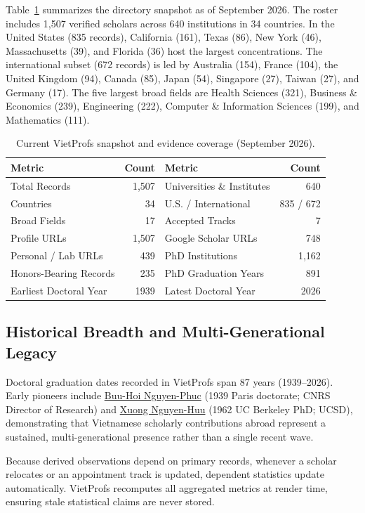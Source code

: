 \documentclass[11pt]{article}
\newcommand{\vplink}[2]{\href{https://vietprofs.roars.dev/?q=#1}{#2}}
\begin{document}
Table~\ref{tab:snapshot} summarizes the directory snapshot as of September 2026. The roster includes 1,507 verified scholars across 640 institutions in 34 countries. In the United States (835 records), California (161), Texas (86), New York (46), Massachusetts (39), and Florida (36) host the largest concentrations. The international subset (672 records) is led by Australia (154), France (104), the United Kingdom (94), Canada (85), Japan (54), Singapore (27), Taiwan (27), and Germany (17).
The five largest broad fields are Health Sciences (321), Business \& Economics (239), Engineering (222), Computer \& Information Sciences (199), and Mathematics (111).

\begin{table}[t]
\centering
\caption{Current VietProfs snapshot and evidence coverage (September 2026).}
\label{tab:snapshot}
\small
\begin{tabular}{lr@{\qquad}lr}
\toprule
Metric & Count & Metric & Count \\
\midrule
Total Records & 1,507 & Universities \& Institutes & 640 \\
Countries & 34 & U.S. / International & 835 / 672 \\
Broad Fields & 17 & Accepted Tracks & 7 \\
Profile URLs & 1,507 & Google Scholar URLs & 748 \\
Personal / Lab URLs & 439 & PhD Institutions & 1,162 \\
Honors-Bearing Records & 235 & PhD Graduation Years & 891 \\
Earliest Doctoral Year & 1939 & Latest Doctoral Year & 2026 \\
\bottomrule
\end{tabular}
\end{table}

\subsection{Historical Breadth and Multi-Generational Legacy}
Doctoral graduation dates recorded in VietProfs span 87 years (1939--2026). Early pioneers include \vplink{Buu-Hoi+Nguyen-Phuc}{Buu-Hoi Nguyen-Phuc} (1939 Paris doctorate; CNRS Director of Research) and \vplink{Xuong+Nguyen-Huu}{Xuong Nguyen-Huu} (1962 UC Berkeley PhD; UCSD), demonstrating that Vietnamese scholarly contributions abroad represent a sustained, multi-generational presence rather than a single recent wave.

Because derived observations depend on primary records, whenever a scholar relocates or an appointment track is updated, dependent statistics update automatically. VietProfs recomputes all aggregated metrics at render time, ensuring stale statistical claims are never stored.
\end{document}
